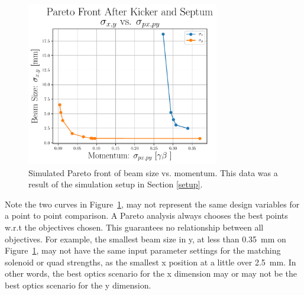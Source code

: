 \begin{figure}
	\centering
	\includegraphics[width=0.75\textwidth]{./images/xy_vs_pxpy_pareto_front_Q5}
	\caption{Simulated Pareto front of beam size vs. momentum.
		This data was a result of the simulation setup in Section \ref{setup}.}
	\label{fig:tba-paretoxy}
\end{figure}
Note the two curves in Figure~\ref{fig:tba-paretoxy}, may not represent the same 
design variables for a point to point comparison. A Pareto analysis always 
chooses the best points w.r.t the objectives chosen. This guarantees no 
relationship between all objectives. 
For example, the smallest beam size in y, at less than \SI{0.35}{mm} on Figure~\ref{fig:tba-paretoxy}, 
may not have the same input parameter settings for the matching solenoid or quad strengths, as the smallest x position 
at a little over \SI{2.5}{mm}. In other words, the best optics scenario for the x dimension
may or may not be the best optics scenario for the y dimension. 

